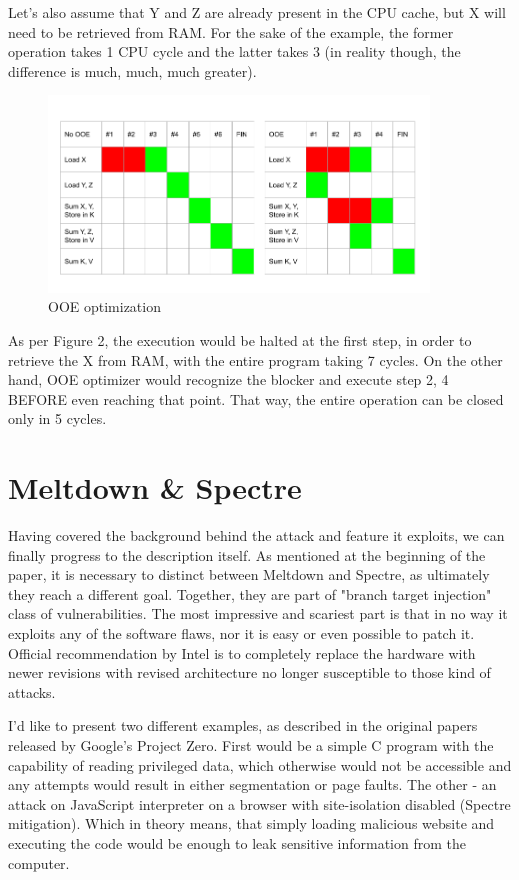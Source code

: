 \documentclass{article}
\begin{document}
Let's also assume that Y and Z are already present in the CPU cache, but X will need to be retrieved from RAM. For the sake of the example, the former operation takes 1 CPU cycle and the latter takes 3 (in reality though, the difference is much, much, much greater).

\begin{figure}[ht]
\centering
\includegraphics[width=0.9\textwidth]{OOE}
  \caption{OOE optimization}
\end{figure}

As per Figure 2, the execution would be halted at the first step, in order to retrieve the X from RAM, with the entire program taking 7 cycles. On the other hand, OOE optimizer would recognize the blocker and execute step 2, 4 BEFORE even reaching that point. That way, the entire operation can be closed only in 5 cycles.

\section{Meltdown \& Spectre}
 
Having covered the background behind the attack and feature it exploits, we can finally progress to the description itself. As mentioned at the beginning of the paper, it is necessary to distinct between Meltdown and Spectre, as ultimately they reach a different goal. Together, they are part of "branch target injection" class of vulnerabilities. The most impressive and scariest part is that in no way it exploits any of the software flaws, nor it is easy or even possible to patch it. Official recommendation by Intel is to completely replace the hardware with newer revisions with revised architecture no longer susceptible to those kind of attacks.

I'd like to present two different examples, as described in the original papers \cite{kocher2018spectre}\cite{lipp2018meltdown} released by Google's Project Zero. First would be a simple C program with the capability of reading privileged data, which otherwise would not be accessible and any attempts would result in either segmentation or page faults.
The other - an attack on JavaScript interpreter on a browser with site-isolation disabled (Spectre mitigation). Which in theory means, that simply loading malicious website and executing the code would be enough to leak sensitive information from the computer. 
\end{document}
